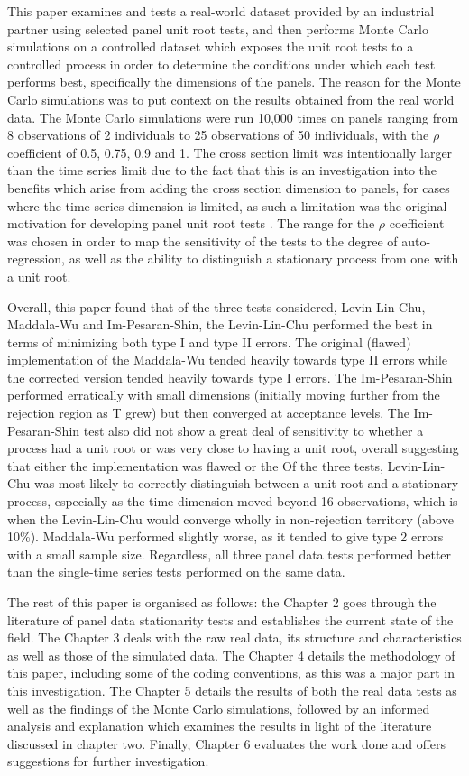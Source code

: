 This paper examines and tests a real-world dataset provided by an industrial partner using selected panel unit root tests, and then performs Monte Carlo simulations on a controlled dataset which exposes the unit root tests to a controlled process in order to determine the conditions under which each test performs best, specifically the dimensions of the panels. The reason for the Monte Carlo simulations was to put context on the results obtained from the real world data. The Monte Carlo simulations were run 10,000 times on panels ranging from 8 observations of 2 individuals to 25 observations of 50 individuals, with the $\rho$ coefficient of 0.5, 0.75, 0.9 and 1. The cross section limit was intentionally larger than the time series limit due to the fact that this is an investigation into the benefits which arise from adding the cross section dimension to panels, for cases where the time series dimension is limited, as such a limitation was the original motivation for developing panel unit root tests \citep{hurlin}. The range for the $\rho$ coefficient was chosen in order to map the sensitivity of the tests to the degree of auto-regression, as well as the ability to distinguish a stationary process from one with a unit root.

Overall, this paper found that of the three tests considered, Levin-Lin-Chu, Maddala-Wu and Im-Pesaran-Shin, the Levin-Lin-Chu performed the best in terms of minimizing both type I and type II errors. The original (flawed) implementation of the Maddala-Wu tended heavily towards type II errors while the corrected version tended heavily towards type I errors. The Im-Pesaran-Shin performed erratically with small dimensions (initially moving further from the rejection region as T grew) but then converged at acceptance levels. The Im-Pesaran-Shin test also did not show a great deal of sensitivity to whether a process had a unit root or was very close to having a unit root, overall suggesting that either the implementation was flawed or the  Of the three tests, Levin-Lin-Chu was most likely to correctly distinguish between a unit root and a stationary process, especially as the time dimension moved beyond 16 observations, which is when the Levin-Lin-Chu would converge wholly in non-rejection territory (above 10\%). Maddala-Wu performed slightly worse, as it tended to give type 2 errors with a small sample size. Regardless, all three panel data tests performed better than the single-time series tests performed on the same data.

The rest of this paper is organised as follows: the Chapter 2 goes through the literature of panel data stationarity tests and establishes the current state of the field. The Chapter 3 deals with the raw real data, its structure and characteristics as well as those of the simulated data. The Chapter 4 details the methodology of this paper, including some of the coding conventions, as this was a major part in this investigation. The Chapter 5 details the results of both the real data tests as well as the findings of the Monte Carlo simulations, followed by an informed analysis and explanation which examines the results in light of the literature discussed in chapter two. Finally, Chapter 6 evaluates the work done and offers suggestions for further investigation.


